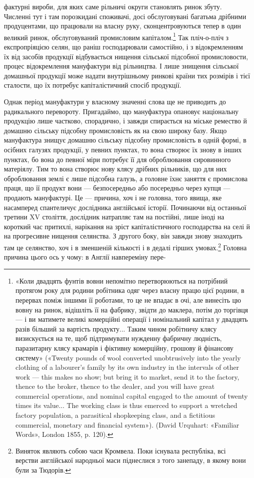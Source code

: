 фактурні вироби, для яких саме рільничі округи становлять
ринок збуту. Численні тут і там порозкидані споживачі, досі
обслуговувані багатьма дрібними продуцентами, що працювали
на власну руку, сконцентровуються тепер в один великий ринок,
обслуговуваний промисловим капіталом.\footnote{
«Коли двадцять фунтів вовни непомітно перетворюються на потрібний
протягом року для родини робітника одяг через власну працю
цієї родини, в перервах поміж іншими її роботами, то це не впадає в очі,
але винесіть цю вовну на ринок, відішліть її на фабрику, звідти до маклера,
потім до торгівця — і ви матимете великі комерційні операції і
номінальний капітал у двадцять разів більший за вартість продукту...
Таким чином робітничу клясу визискується на те, щоб підтримувати
нужденну фабричну людність, паразитарну клясу крамарів і фіктивну
комерційну, грошову й фінансову систему» («Twenty pounds of wool
converted unobtrusively into the yearly clothing of a labourer’s family
by its own industry in the intervals of other work — this makes no show;
but bring it to market, send it to the factory, thence to the broker, thence
to the dealer, and you will have great commercial operations, and nominal
capital engaged to the amount of twenty times its value... The working
class is thus emerced to support a wretched factory population, a parasitical
shopkeeping class, and a fictitious commercial, monetary and financial
system»). (David Urquhart: «Familiar Words», London 1855, p. 120).
} Так пліч-о-пліч
з експропріяцією селян, що раніш господарювали самостійно, і
з відокремленням їх від засобів продукції відбувається нищення
сільської підсобної промисловости, процес відокремлення мануфактури
від рільництва. І лише знищення сільської домашньої
продукції може надати внутрішньому ринкові країни тих розмірів
і тієї сталости, що їх потребує капіталістичний спосіб продукції.

Однак період мануфактури у власному значенні слова ще не
приводить до радикального перевороту. Пригадаймо, що мануфактура
опановує національну продукцію лише частково, спорадично,
і завжди спирається на міське ремество й домашню
сільську підсобну промисловість як на свою широку базу.
Якщо мануфактура знищує домашню сільську підсобну промисловість
в одній формі, в осібних галузях продукції, у певних
пунктах, то вона створює їх знову в інших пунктах, бо вона до
певної міри потребує її для оброблювання сировинного матеріялу.
Тим то вона створює нову клясу дрібних рільників, що для них
оброблювання землі є лише підсобна галузь, а головне їхнє заняття
є промислова праця, що її продукт вони — безпосередньо
або посередньо через купця — продають мануфактурі. Це —
причина, хоч і не головна, того явища, яке насамперед спантеличує
дослідника англійської історії. Починаючи від останньої
третини XV століття, дослідник натрапляє там на постійні,
лише іноді на короткий час притихлі, нарікання на зріст капіталістичного
господарства на селі й на прогресивне нищення
селянства. З другого боку, він завжди знову знаходить там це
селянство, хоч і в зменшеній кількості і в дедалі гірших умовах.\footnote{
Виняток являють собою часи Кромвела. Поки існувала республіка,
всі верстви англійської народньої маси піднеслися з того занепаду,
в якому вони були за Тюдорів.
}
Головна причина цього ось у чому: в Англії навпереміну пере-